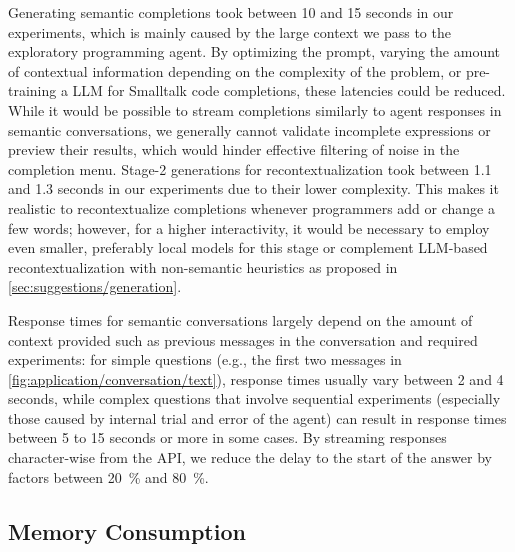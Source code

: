 Generating semantic completions took between 10 and 15 seconds in our experiments, which is mainly caused by the large context we pass to the exploratory programming agent.
By optimizing the prompt, varying the amount of contextual information depending on the complexity of the problem, or pre-training a LLM for Smalltalk code completions, these latencies could be reduced.
While it would be possible to stream completions similarly to agent responses in semantic conversations, we generally cannot validate incomplete expressions or preview their results, which would hinder effective filtering of noise in the completion menu.
Stage-2 generations for recontextualization took between 1.1 and 1.3 seconds in our experiments due to their lower complexity.
This makes it realistic to recontextualize completions whenever programmers add or change a few words; however, for a higher interactivity, it would be necessary to employ even smaller, preferably local models for this stage or complement LLM-based recontextualization with non-semantic heuristics as proposed in \cref{sec:suggestions/generation}.

Response times for semantic conversations largely depend on the amount of context provided such as previous messages in the conversation and required experiments:
for simple questions (e.g., the first two messages in \cref{fig:application/conversation/text}), response times usually vary between 2 and 4 seconds, while complex questions that involve sequential experiments (especially those caused by internal trial and error of the agent) can result in response times between 5 to 15 seconds or more in some cases.
By streaming responses character-wise from the API, we reduce the delay to the start of the answer by factors between \qty{20}{\percent} and \qty{80}{\percent}.

\subsection*{Memory Consumption}
\label{sec:discussion/performance/memory}

